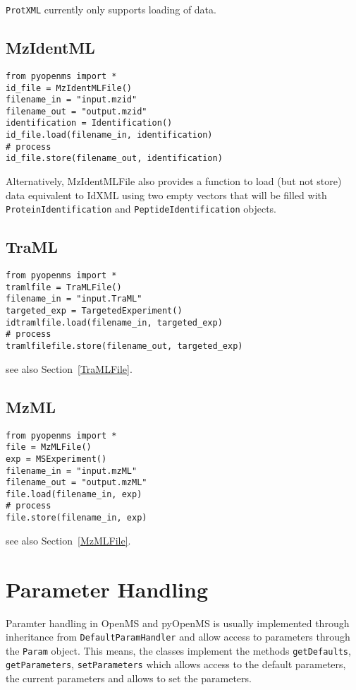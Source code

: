 \documentclass[10pt]{article}
\begin{document}
\texttt{ProtXML} currently only supports loading of data.

\subsection{MzIdentML}
\begin{verbatim}
from pyopenms import *
id_file = MzIdentMLFile()
filename_in = "input.mzid"
filename_out = "output.mzid"
identification = Identification()
id_file.load(filename_in, identification)
# process
id_file.store(filename_out, identification)
\end{verbatim}

Alternatively, MzIdentMLFile also provides a function to load (but not store)
data equivalent to IdXML using two empty vectors that will be filled with
\texttt{ProteinIdentification} and \texttt{PeptideIdentification} objects.

\subsection{TraML}
\begin{verbatim}
from pyopenms import *
tramlfile = TraMLFile()
filename_in = "input.TraML"
targeted_exp = TargetedExperiment()
idtramlfile.load(filename_in, targeted_exp)
# process
tramlfilefile.store(filename_out, targeted_exp)
\end{verbatim}

see also Section~\ref{TraMLFile}.

\subsection{MzML}
\begin{verbatim}
from pyopenms import *
file = MzMLFile()
exp = MSExperiment()
filename_in = "input.mzML"
filename_out = "output.mzML"
file.load(filename_in, exp)
# process
file.store(filename_in, exp)
\end{verbatim}

see also Section~\ref{MzMLFile}.

\pagebreak
\section{Parameter Handling}

Paramter handling in OpenMS and pyOpenMS is usually implemented through
inheritance from \texttt{DefaultParamHandler} and allow access to parameters
through the \texttt{Param} object. This means, the classes implement the
methods \texttt{getDefaults}, \texttt{getParameters}, \texttt{setParameters}
which allows access to the default parameters, the current parameters and
allows to set the parameters.
\end{document}
